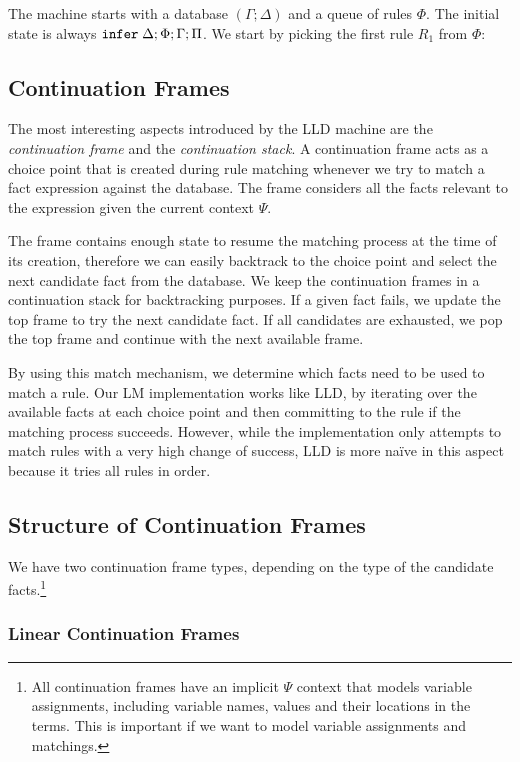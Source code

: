 The machine starts with a database $(\Gamma; \Delta)$ and a queue of rules
$\Phi$. The initial state is always $\mathtt{infer} \; \Delta; \Phi; \Gamma; \Pi$.
We start by picking the first rule $R_1$ from $\Phi$:



\subsection{Continuation Frames}

The most interesting aspects introduced by the LLD machine are the
\emph{continuation frame} and the \emph{continuation stack}. A continuation
frame acts as a choice point that is created during rule matching whenever we
try to match a fact expression against the database.  The frame considers all
the facts relevant to the expression given the current context $\Psi$.

The frame contains enough state to resume the matching process at the time of
its creation, therefore we can easily backtrack to the choice point and select
the next candidate fact from the database.  We keep the continuation frames in a
continuation stack for backtracking purposes. If a given fact fails, we update
the top frame to try the next candidate fact. If all candidates are exhausted,
we pop the top frame and continue with the next available frame.

By using this match mechanism, we determine which facts need to be used to match
a rule.  Our LM implementation works like LLD, by iterating over the available
facts at each choice point and then committing to the rule if the matching
process succeeds. However, while the implementation only attempts to match rules
with a very high change of success, LLD is more na\"{i}ve in this aspect because
it tries all rules in order.


\subsection{Structure of Continuation Frames}

We have two continuation frame types, depending on the type of the candidate
facts.\footnote{All continuation frames have an implicit $\Psi$ context that
models variable assignments, including variable names, values and their
locations in the terms. This is important if we want to model variable
assignments and matchings.}

\subsubsection{Linear Continuation Frames}

